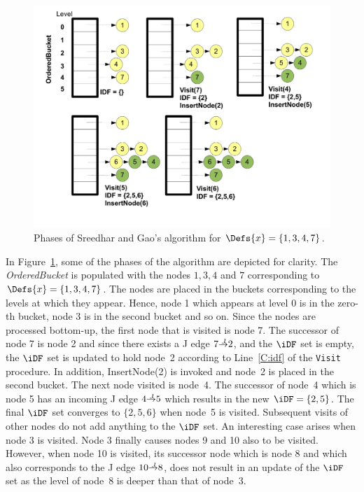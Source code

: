 {    \begin{figure}[htb]
    \centerline{\includegraphics[scale=0.3]{sreedhargao.pdf}}
    \caption{Phases of Sreedhar and Gao's algorithm for $\Defs{x}=\{1,3,4,7\}$.}
    \label{fig:sreedhargao}
    \end{figure} 


In Figure~\ref{fig:sreedhargao}, some of the phases of the algorithm are 
depicted for clarity. The \textit{OrderedBucket}
is populated with the nodes $1,3,4$ and $7$ corresponding to $\Defs{x}=\{1,3,4,7\}$. The nodes are
placed in the buckets corresponding to the levels at which they appear. Hence, node 1 which appears at 
level 0 is in the zero-th bucket, node 3 is in the second bucket and so on. Since the
nodes are processed bottom-up, the first node that is visited is node 7. The successor of node 7 is node
2 and since there exists a J edge $7 \st{J} 2$, and the $\iDF$ set is empty, the $\iDF$ set is updated
to hold node~2 according to Line~\ref{C:idf} of the \texttt{Visit} procedure. In addition, InsertNode(2) is invoked and 
node~2 is placed in the second bucket. The next node visited is node~4. The successor of node~4 which is node
5 has an incoming J edge $4 \st{J} 5$ which results in the new $\iDF = \{2,5\}$. The final $\iDF$ set converges
to $\{2,5,6\}$ when node~5 is visited. Subsequent visits of other nodes do not add anything to the
$\iDF$ set. An interesting case arises when node 3 is visited. Node 3 finally causes nodes 9 and 10 also 
to be visited. However, when node 10 is visited, its successor node which is node 8 and which also 
corresponds to the J edge $10 \st{J} 8$, does not result in an update of the $\iDF$ set as the level of
node~8 is deeper than that of node~3.


}
